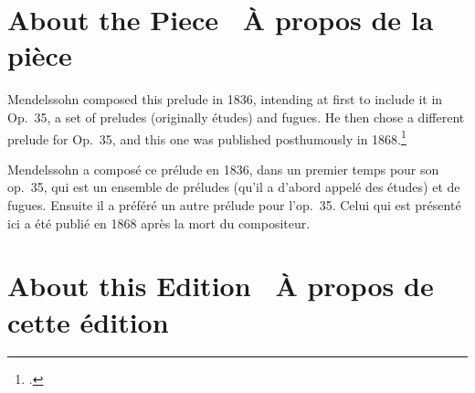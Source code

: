 \documentclass[a4paper, 12pt]{book}
\newcommand{\bigdot}[0]{{\Large \textbullet}}
\newcommand{\centerbigdot}[0]{\begin{center}\bigdot\end{center}}
\begin{document}
\section*{About the Piece \bigdot\ \foreignlanguage{french}{À propos de la pièce}}

Mendelssohn composed this prelude in 1836, intending at first to
include it in Op.\ 35, a set of preludes (originally études) and
fugues. He then chose a different prelude for Op.\ 35, and this one
was published posthumously in 1868.\footnote{\cite[188--198]{todd_2008}\label{todd}.}

\centerbigdot

\begin{otherlanguage}{french}
Mendelssohn a composé ce prélude en 1836, dans un premier temps pour
son op.\ 35, qui est un ensemble de préludes (qu'il a d'abord appelé
des études) et de fugues. Ensuite il a préféré un autre prélude pour
l'op.\ 35. Celui qui est présenté ici a été publié en 1868 après la
mort du compositeur.
\end{otherlanguage}

\section*{About this Edition \bigdot\ \foreignlanguage{french}{À propos de cette édition}}
\end{document}
